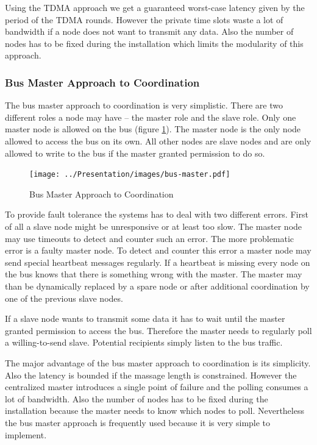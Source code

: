 \documentclass[pdftex,12pt,a4paper,fleqn]{scrartcl}
\begin{document}
Using the TDMA approach we get a guaranteed worst-case latency given by the period of the TDMA rounds. However the private time slots waste a lot of bandwidth if a node does not want to transmit any data. Also the number of nodes has to be fixed during the installation which limits the modularity of this approach.

\subsubsection{Bus Master Approach to Coordination}
The bus master approach to coordination is very simplistic. There are two different roles a node may have – the master role and the slave role. Only one master node is allowed on the bus (figure \ref{fig:bus_master_approach}). The master node is the only node allowed to access the bus on its own. All other nodes are slave nodes and are only allowed to write to the bus if the master granted permission to do so.

\begin{figure}[h]	
	\centering
  \texttt{[image: ../Presentation/images/bus-master.pdf]}
  \caption{Bus Master Approach to Coordination}
  \label{fig:bus_master_approach}
\end{figure}

To provide fault tolerance the systems has to deal with two different errors. First of all a slave node might be unresponsive or at least too slow. The master node may use timeouts to detect and counter such an error. The more problematic error is a faulty master node. To detect and counter this error a master node may send special heartbeat messages regularly. If a heartbeat is missing every node on the bus knows that there is something wrong with the master. The master may than be dynamically replaced by a spare node or after additional coordination by one of the previous slave nodes.

If a slave node wants to transmit some data it has to wait until the master granted permission to access the bus. Therefore the master needs to regularly poll a willing-to-send slave. Potential recipients simply listen to the bus traffic.

The major advantage of the bus master approach to coordination is its simplicity. Also the latency is bounded if the massage length is constrained. However the centralized master introduces a single point of failure and the polling consumes a lot of bandwidth. Also the number of nodes has to be fixed during the installation because the master needs to know which nodes to poll. Nevertheless the bus master approach is frequently used because it is very simple to implement.
\end{document}
